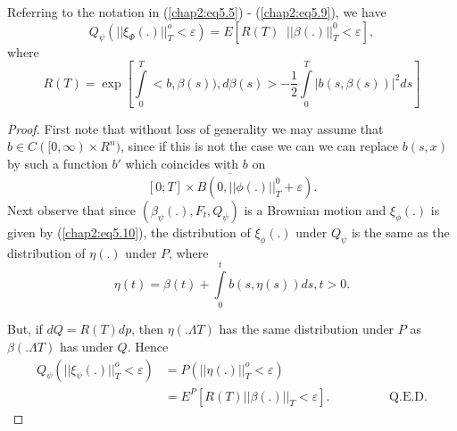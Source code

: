 \setcounter{lemma}{11}
\begin{lemma} %
Referring to the notation in (\ref{chap2:eq5.5}) -
(\ref{chap2:eq5.9}), we have   
$$
Q_\psi (|| \xi_\Phi (.) ||^o_T < \varepsilon ) =  E [R(T) \;\; || \beta (.)
  ||^0_T < \varepsilon], 
$$
where
$$
R(T)= \exp[ \int\limits_{0}^T < b, \beta(s)), d \beta(s) >-
  \frac{1}{2} \int\limits_{0}^T|b(s, \beta(s)) |^2 ds] 
$$
\end{lemma}

\begin{proof}
First note that without loss of generality we may assume that $b \in
C([0, \infty) \times R^n)$, since if this is not the case we can we
  can replace $b(s,x)$ by such a function $b'$ which coincides with
  $b$ on 
$$
\overline{[0;T]\times B(0,|| \phi(.) ||^0_T +
    \varepsilon)}. 
$$
Next observe that since $(\beta_\psi(.), F_t,
  Q_\psi)$ is a Brownian motion and $\xi_\phi(.)$ is given by
  (\ref{chap2:eq5.10}), the distribution of $\xi_\phi(.)$ under
  $Q_\psi$ is the   same as the distribution of $\eta(.)$ under $P$,
  where   
$$
\eta(t) =\beta(t) + \int\limits_{0}^t b(s, \eta(s)) ds , t > 0. 
$$ 

But, if $dQ=R(T) dp$, then $\eta(. \Lambda T)$ has the same
distribution under $P$ as $\beta(. \Lambda T)$ has under $Q$. Hence  
\begin{align*}
Q_\psi( || \xi_\psi(.) ||^o_T  < \varepsilon) &= P(|| \eta (.) ||^o_T
< \varepsilon )\\ 
&= E^P[R(T) || \beta (.) ||_T < \varepsilon ].  \hspace{2cm}{\text{Q.E.D.}}
\end{align*}


\end{proof}
